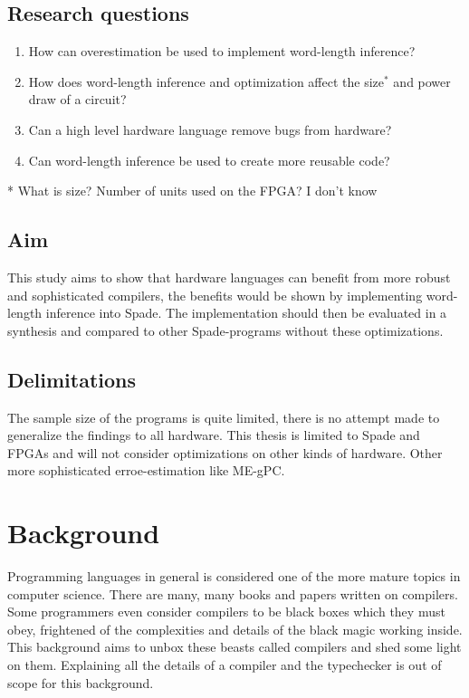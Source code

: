 \documentclass[msc,lith,english]{liuthesis}
\begin{document}
\section{Research questions}
\begin{enumerate}
  \item How can overestimation be used to implement word-length inference?
  \item How does word-length inference and optimization affect the size${}^{*}$ and power draw of a circuit?
  \item Can a high level hardware language remove bugs from hardware?
  \item Can word-length inference be used to create more reusable code?
\end{enumerate}
* What is size? Number of units used on the FPGA? I don't know


\section{Aim}
This study aims to show that hardware languages can benefit from more robust and sophisticated compilers, the benefits would be shown by implementing word-length inference into Spade. The implementation should then be evaluated in a synthesis and compared to other Spade-programs without these optimizations.

\section{Delimitations}
The sample size of the programs is quite limited, there is no attempt made to generalize the findings to all hardware. This thesis is limited to Spade and FPGAs and will not consider optimizations on other kinds of hardware. Other more sophisticated erroe-estimation like ME-gPC.

\chapter{Background}
\label{chaBackground}
Programming languages in general is considered one of the more mature topics in computer science. There are many, many books and papers written on compilers. Some programmers even consider compilers to be black boxes which they must obey, frightened of the complexities and details of the black magic working inside. This background aims to unbox these beasts called compilers and shed some light on them. Explaining all the details of a compiler and the typechecker is out of scope for this background.
\end{document}
